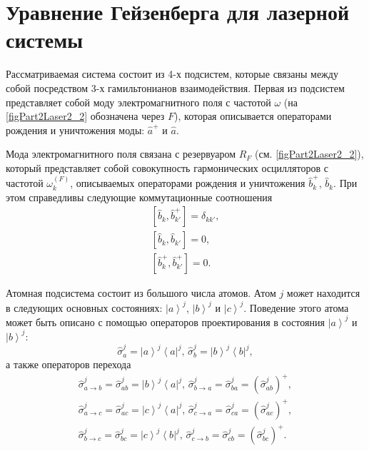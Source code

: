 \section{Уравнение Гейзенберга для лазерной системы}

Рассматриваемая система состоит из 4-х подсистем, которые связаны
между собой посредством 3-х гамильтонианов взаимодействия. Первая из
подсистем представляет собой моду электромагнитного поля с частотой
$\omega$ (на \autoref{figPart2Laser2_2} обозначена через $F$),
которая описывается операторами рождения и уничтожения моды: 
$\hat{a}^{+}$ и $\hat{a}$. 

Мода электромагнитного поля связана с
резервуаром $R_F$ (см. \autoref{figPart2Laser2_2}), который
представляет собой совокупность гармонических осцилляторов с частотой
$\omega_k^{(F)}$, описываемых операторами рождения и уничтожения
$\hat{b}_k^{+}$, $\hat{b}_k$. При этом справедливы следующие
коммутационные соотношения 
\begin{eqnarray}
\left[\hat{b}_k, \hat{b}^{+}_{k'}\right] = \delta_{kk'},
\nonumber \\
\left[\hat{b}_k, \hat{b}_{k'}\right] = 0,
\nonumber \\
\left[\hat{b}^{+}_k, \hat{b}^{+}_{k'}\right] = 0.
\nonumber
\end{eqnarray}

Атомная подсистема состоит из большого числа атомов. Атом $j$ может
находится в следующих основных состояниях:
$\left|a\right>^j$, $\left|b\right>^j$ и $\left|c\right>^j$. Поведение
этого атома может быть описано с помощью операторов проектирования в
состояния $\left|a\right>^j$ и $\left|b\right>^j$:
\begin{equation}
\hat{\sigma}_a^j = \left|a\right>^j\left<a\right|^j,\,
\hat{\sigma}_b^j = \left|b\right>^j\left<b\right|^j,
\nonumber
\end{equation}
а также операторов перехода
\begin{eqnarray}
\hat{\sigma}_{a \rightarrow b}^j = \hat{\sigma}_{ab}^j =
\left|b\right>^j\left<a\right|^j,\,
\hat{\sigma}_{b \rightarrow a}^j = \hat{\sigma}_{ba}^j =
\left(\hat{\sigma}_{ab}^j\right)^{+},
\nonumber \\
\hat{\sigma}_{a \rightarrow c}^j = \hat{\sigma}_{ac}^j =
\left|c\right>^j\left<a\right|^j,\,
\hat{\sigma}_{c \rightarrow a}^j = \hat{\sigma}_{ca}^j =
\left(\hat{\sigma}_{ac}^j\right)^{+},
\nonumber \\
\hat{\sigma}_{b \rightarrow c}^j = \hat{\sigma}_{bc}^j =
\left|c\right>^j\left<b\right|^j,\,
\hat{\sigma}_{c \rightarrow b}^j = \hat{\sigma}_{cb}^j =
\left(\hat{\sigma}_{bc}^j\right)^{+}.
\nonumber 
\end{eqnarray}

